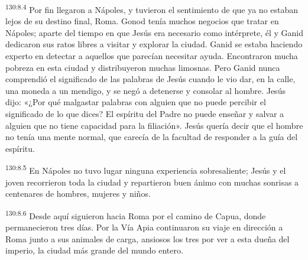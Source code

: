 \par
\textsuperscript{130:8.4} Por fin llegaron a Nápoles, y tuvieron el sentimiento de que ya no estaban lejos de su destino final, Roma. Gonod tenía muchos negocios que tratar en Nápoles; aparte del tiempo en que Jesús era necesario como intérprete, él y Ganid dedicaron sus ratos libres a visitar y explorar la ciudad. Ganid se estaba haciendo experto en detectar a aquellos que parecían necesitar ayuda. Encontraron mucha pobreza en esta ciudad y distribuyeron muchas limosnas. Pero Ganid nunca comprendió el significado de las palabras de Jesús cuando le vio dar, en la calle, una moneda a un mendigo, y se negó a detenerse y consolar al hombre. Jesús dijo: «¿Por qué malgastar palabras con alguien que no puede percibir el significado de lo que dices? El espíritu del Padre no puede enseñar y salvar a alguien que no tiene capacidad para la filiación». Jesús quería decir que el hombre no tenía una mente normal, que carecía de la facultad de responder a la guía del espíritu.

\par
\textsuperscript{130:8.5} En Nápoles no tuvo lugar ninguna experiencia sobresaliente; Jesús y el joven recorrieron toda la ciudad y repartieron buen ánimo con muchas sonrisas a centenares de hombres, mujeres y niños.

\par
\textsuperscript{130:8.6} Desde aquí siguieron hacia Roma por el camino de Capua, donde permanecieron tres días. Por la Vía Apia continuaron su viaje en dirección a Roma junto a sus animales de carga, ansiosos los tres por ver a esta dueña del imperio, la ciudad más grande del mundo entero.